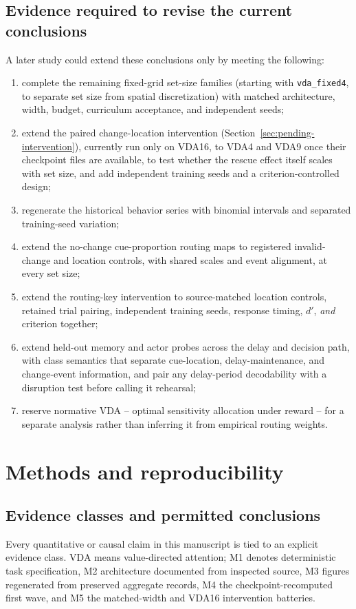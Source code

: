 \documentclass[11pt,a4paper]{article}
\newcommand{\env}[1]{\texttt{#1}}
\begin{document}
\subsection{Evidence required to revise the current conclusions}
A later study could extend these conclusions only by meeting the following:
\begin{enumerate}
\item complete the remaining fixed-grid set-size families (starting with \env{vda\_fixed4}, to separate set size from spatial discretization) with matched architecture, width, budget, curriculum acceptance, and independent seeds;
\item extend the paired change-location intervention (Section~\ref{sec:pending-intervention}), currently run only on VDA16, to VDA4 and VDA9 once their checkpoint files are available, to test whether the rescue effect itself scales with set size, and add independent training seeds and a criterion-controlled design;
\item regenerate the historical behavior series with binomial intervals and separated training-seed variation;
\item extend the no-change cue-proportion routing maps to registered invalid-change and location controls, with shared scales and event alignment, at every set size;
\item extend the routing-key intervention to source-matched location controls, retained trial pairing, independent training seeds, response timing, $d'$, \emph{and} criterion together;
\item extend held-out memory and actor probes across the delay and decision path, with class semantics that separate cue-location, delay-maintenance, and change-event information, and pair any delay-period decodability with a disruption test before calling it rehearsal;
\item reserve normative VDA -- optimal sensitivity allocation under reward -- for a separate analysis rather than inferring it from empirical routing weights.
\end{enumerate}

\section{Methods and reproducibility}\label{sec:methods}
\subsection{Evidence classes and permitted conclusions}\label{sec:evidence-classes}
Every quantitative or causal claim in this manuscript is tied to an explicit evidence class. VDA means value-directed attention; M1 denotes deterministic task specification, M2 architecture documented from inspected source, M3 figures regenerated from preserved aggregate records, M4 the checkpoint-recomputed first wave, and M5 the matched-width and VDA16 intervention batteries.
\end{document}
